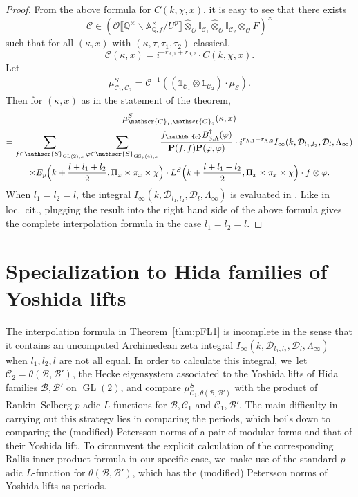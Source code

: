 \documentclass[10pt]{amsart}
\newcommand{\loccit}{loc.\ cit.}
\newcommand{\Lfunction}{$L$\nobreakdash-func\-tion\xspace}
\newcommand{\Lfunctions}{$L$\nobreakdash-func\-tions\xspace}
\theoremstyle{plain}
\theoremstyle{remark}
\newcommand{\bA}{\mathbb{A}}
\newcommand{\bI}{\mathbb{I}}
\newcommand{\bQ}{\mathbb{Q}}
\newcommand{\bS}{\mathbb{S}}
\newcommand{\bbc}{\mathbb{c}}
\newcommand{\cC}{\mathcal{C}}
\newcommand{\cD}{\mathcal{D}}
\newcommand{\cE}{\mathcal{E}}
\newcommand{\cO}{\mathcal{O}}
\newcommand{\sB}{\mathscr{B}}
\newcommand{\sC}{\mathscr{C}}
\newcommand{\sS}{\mathscr{S}}
\newcommand{\bfP}{\mathbf{P}}
\DeclareMathOperator{\GL}{GL}
\DeclareMathOperator{\GSp}{GSp}
\let\bes B
\let\llb\llbracket
\let\rrb\rrbracket
\newcommand{\sLambda}{\scriptscriptstyle{\Lambda}}
\begin{document}
\begin{proof}
From the above formula for $C(k,\chi,x)$, it is easy to see that there exists
\[
\cC\in \left(\cO\llb \bQ^\times\backslash\bA^\times_{\bQ,f}/U^p\rrb \hat{\otimes}_{\cO} \bI_{\sC_1}\hat{\otimes}_\cO \bI_{\sC_2}\otimes_\cO F\right)^\times
\]
such that for all $(\kappa,x)$ with $(\kappa,\tau,\tau_1,\tau_2)$ classical,
\[
\cC(\kappa,x)=i^{-r_{\sLambda,1}+r_{\sLambda,2}}\cdot C(k,\chi,x).
\]
Let
\begin{align*}
\mu^S_{\sC_1,\sC_2}= \cC^{-1}\left((\mathds{1}_{\sC_1}\otimes \mathds{1}_{\sC_2})\cdot \mu_{\cE}\right).
\end{align*}
Then for $(\kappa,x)$ as in the statement of the theorem,
\begin{multline*}
\mu^S_{\sC_1,\sC_2}(\kappa,x)\\
=\sum_{f\in \sS_{\GL(2),x}}\sum_{\varphi\in \sS_{\GSp(4),x}}
\frac{f_\bbc \bes^\dagger_{\bS,\Lambda}(\varphi)}{\bfP(f,f)\bfP(\varphi,\varphi)}
\cdot i^{r_{\sLambda,1}-r_{\sLambda,2}}I_\infty(k,\cD_{l_1,l_2},\cD_l,\Lambda_\infty)\\
\times E_p\Bigl(k+\frac{l+l_1+l_2}{2},\Pi_x\times\pi_x\times \chi\Bigr)\cdot L^S\Bigl(k+\frac{l+l_1+l_2}{2},\Pi_x\times\pi_x\times \chi\Bigr)
\cdot f\otimes\varphi.
\end{multline*}
When $l_1=l_2=l$, the integral $I_\infty(k,\cD_{l_1,l_2},\cD_l,\Lambda_\infty)$ is evaluated in \cite[Prop.\,4.2]{pFL}. Like in \loccit, plugging the result into the right hand side of the above formula gives the complete interpolation formula in the case $l_1=l_2=l$.
\end{proof}

\section{Specialization to Hida families of Yoshida lifts}
The interpolation formula in Theorem~\ref{thm:pFL1} is incomplete in the sense that it contains an uncomputed Archimedean zeta integral $I_\infty(k,\cD_{l_1,l_2},\cD_l,\Lambda_\infty)$ when $l_1,l_2,l$ are not all equal. In order to calculate this integral, we~let $\sC_2=\theta(\sB,\sB')$, the Hecke eigensystem associated to the Yoshida lifts of Hida families $\sB,\sB'$ on $\GL(2)$, and compare $\mu^S_{\sC_1,\theta(\sB,\sB')}$ with the product of Rankin--Selberg $p$-adic \Lfunctions for $\sB,\sC_1$ and $\sC_1,\sB'$. The main difficulty in carrying out this strategy lies in comparing the periods, which boils down to comparing the (modified) Petersson norms of a pair of modular forms and that of their Yoshida lift. To circumvent the explicit calculation of the corresponding Rallis inner product formula in our specific case, we~make use of the standard $p$-adic \Lfunction for $\theta(\sB,\sB')$, which has the (modified) Petersson norms of Yoshida lifts as periods.
\end{document}
